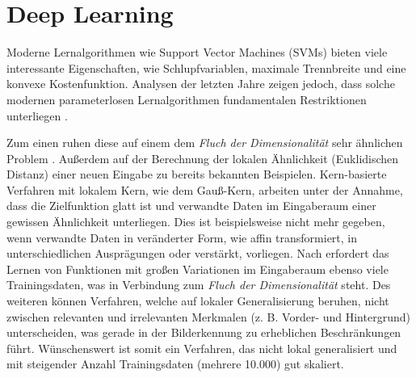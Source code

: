 \section{Deep Learning}
\label{ch:DeepLearning}
Moderne Lernalgorithmen wie Support Vector Machines (SVMs) bieten viele interessante Eigenschaften, wie Schlupfvariablen, maximale Trennbreite und eine konvexe Kostenfunktion. Analysen der letzten Jahre zeigen jedoch, dass solche modernen parameterlosen Lernalgorithmen fundamentalen Restriktionen unterliegen \cite[vgl. hierzu und im Folgenden][]{Bengio2007b}.

Zum einen ruhen diese auf einem dem \textit{Fluch der Dimensionalität} sehr ähn\-lichen Problem \cite[siehe][]{Duda73}. Außerdem auf der Berechnung der lokalen Ähnlichkeit (Euklidischen Distanz) einer neuen Eingabe zu bereits bekannten Beispielen. Kern-basierte Verfahren mit lokalem Kern, wie dem Gauß-Kern, arbeiten unter der Annahme, dass die Zielfunktion glatt ist und verwandte Daten im Eingaberaum einer gewissen Ähnlichkeit unterliegen. Dies ist beispielsweise nicht mehr gegeben, wenn verwandte Daten in veränderter Form, wie affin transformiert, in unterschiedlichen Ausprägungen oder verstärkt, vorliegen. Nach \cite{Bengio2007b} erfordert das Lernen von Funktionen mit großen Variationen im Eingaberaum ebenso viele Trainingsdaten, was in Verbindung zum \textit{Fluch der Dimensionalität} steht. Des weiteren können Verfahren, welche auf lokaler Generalisierung beruhen, nicht zwischen relevanten und irrelevanten Merkmalen (z. B. Vorder- und Hintergrund) unterscheiden, was gerade in der Bilderkennung zu erheblichen Beschränkungen führt. Wünschenswert ist somit ein Verfahren, das nicht lokal generalisiert und mit steigender Anzahl Trainingsdaten (mehrere 10.000) gut skaliert.

